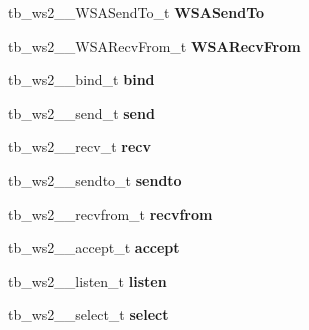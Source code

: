 \begin{DoxyCompactItemize}
\item 
\hypertarget{structtb__ws2__32__t_a3bbd87a0141541aafc597df2402f8998}{tb\-\_\-ws2\-\_\-\_\-\-W\-S\-A\-Send\-To\-\_\-t {\bfseries W\-S\-A\-Send\-To}}\label{structtb__ws2__32__t_a3bbd87a0141541aafc597df2402f8998}

\item 
\hypertarget{structtb__ws2__32__t_a2a5283e0c52d3a7fc5f7d30940a75b95}{tb\-\_\-ws2\-\_\-\_\-\-W\-S\-A\-Recv\-From\-\_\-t {\bfseries W\-S\-A\-Recv\-From}}\label{structtb__ws2__32__t_a2a5283e0c52d3a7fc5f7d30940a75b95}

\item 
\hypertarget{structtb__ws2__32__t_acc6a15a64a720b732619677c029edf99}{tb\-\_\-ws2\-\_\-\_\-bind\-\_\-t {\bfseries bind}}\label{structtb__ws2__32__t_acc6a15a64a720b732619677c029edf99}

\item 
\hypertarget{structtb__ws2__32__t_a8bbd3195d95368f750c2686ff445128f}{tb\-\_\-ws2\-\_\-\_\-send\-\_\-t {\bfseries send}}\label{structtb__ws2__32__t_a8bbd3195d95368f750c2686ff445128f}

\item 
\hypertarget{structtb__ws2__32__t_aebc8b420d047ed1ed45165536dad22e8}{tb\-\_\-ws2\-\_\-\_\-recv\-\_\-t {\bfseries recv}}\label{structtb__ws2__32__t_aebc8b420d047ed1ed45165536dad22e8}

\item 
\hypertarget{structtb__ws2__32__t_ac872d7cd55cdd0c9e09c4b1ed8cb0339}{tb\-\_\-ws2\-\_\-\_\-sendto\-\_\-t {\bfseries sendto}}\label{structtb__ws2__32__t_ac872d7cd55cdd0c9e09c4b1ed8cb0339}

\item 
\hypertarget{structtb__ws2__32__t_ad645ee1572a3997ea5da390393d96f52}{tb\-\_\-ws2\-\_\-\_\-recvfrom\-\_\-t {\bfseries recvfrom}}\label{structtb__ws2__32__t_ad645ee1572a3997ea5da390393d96f52}

\item 
\hypertarget{structtb__ws2__32__t_a3ad04be34dab6725a79d10171e52b6b8}{tb\-\_\-ws2\-\_\-\_\-accept\-\_\-t {\bfseries accept}}\label{structtb__ws2__32__t_a3ad04be34dab6725a79d10171e52b6b8}

\item 
\hypertarget{structtb__ws2__32__t_ad16e905932c5bf94eda92920cf0d7da1}{tb\-\_\-ws2\-\_\-\_\-listen\-\_\-t {\bfseries listen}}\label{structtb__ws2__32__t_ad16e905932c5bf94eda92920cf0d7da1}

\item 
\hypertarget{structtb__ws2__32__t_a76891b03b204a146d00dd418952b1819}{tb\-\_\-ws2\-\_\-\_\-select\-\_\-t {\bfseries select}}\label{structtb__ws2__32__t_a76891b03b204a146d00dd418952b1819}


\end{DoxyCompactItemize}
